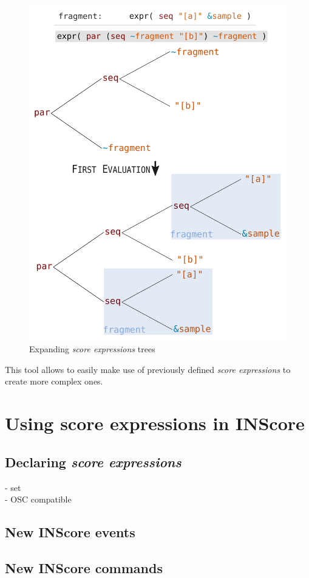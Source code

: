\documentclass{article}
\newcommand{\sExpr}{\emph{score expressions} }
\begin{document}
\begin{figure}[th]
\centering
\includegraphics[width=0.9\columnwidth]{imgs/expandingTree}
\caption{Expanding \sExpr trees
\label{fig:example}}
\end{figure}

This tool allows to easily make use of previously defined \sExpr	 to create more complex ones.


\section{Using score expressions in INScore}
\subsection{Declaring \sExpr}
- set \\
- OSC compatible
\subsection{New INScore events}

\subsection{New INScore commands}
\end{document}
